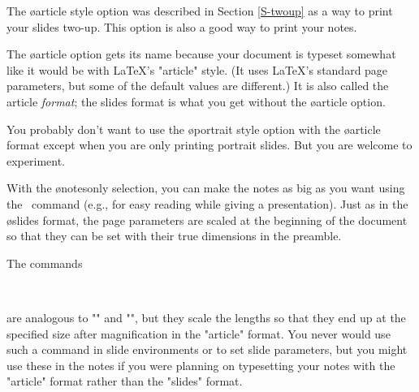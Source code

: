 The \o{article} style option was described in Section \ref{S-twoup} as a way
to print your slides two-up. This option is also a good way to print your
notes.

The \o{article} option gets its name because your document is typeset somewhat
like it would be with \LaTeX's "article" style. (It uses \LaTeX's standard
page parameters, but some of the default values are different.) It is also
called the article {\em format}; the slides format is what you get without the
\o{article} option.

You probably don't want to use the \o{portrait} style option with the
\o{article} format except when you are only printing portrait slides. But you
are welcome to experiment.

With the \o{notesonly} selection, you can make the notes as big as you want
using the \n\articlemag\ command (e.g., for easy reading while giving a
presentation). Just as in the \o{slides} format, the page parameters are
scaled at the beginning of the document so that they can be set with their
true dimensions in the preamble.

The commands
\begin{MD}
  \\
\end{MD}
are analogous to "\setslidelength" and "\addtoslidelength", but they scale the
lengths so that they end up at the specified size after magnification in the
"article" format. You never would use such a command in slide environments or
to set slide parameters, but you might use these in the notes if you were
planning on typesetting your notes with the "article" format rather than the
"slides" format.

